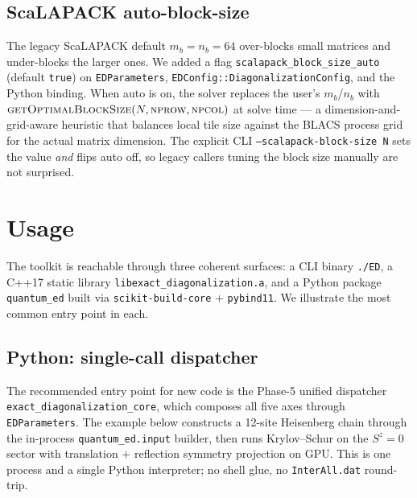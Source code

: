 \documentclass[submission, PhysCodeb]{SciPost}
\begin{document}
\subsection{ScaLAPACK auto-block-size}
\label{sec:perf-scalapack}
The legacy ScaLAPACK default $m_b = n_b = 64$ over-blocks small
matrices and under-blocks the larger ones. We added a flag
\texttt{scalapack\_block\_size\_auto} (default \texttt{true}) on
\texttt{EDParameters}, \texttt{EDConfig::DiagonalizationConfig}, and
the Python binding. When auto is on, the solver replaces the user's
$m_b$/$n_b$ with $\textsc{getOptimalBlockSize}(N,
\textsc{nprow}, \textsc{npcol})$ at solve time --- a
dimension-and-grid-aware heuristic that balances local tile size
against the BLACS process grid for the actual matrix dimension. The
explicit CLI \texttt{--scalapack-block-size N} sets the value
\emph{and} flips auto off, so legacy callers tuning the block size
manually are not surprised.

\section{Usage}
\label{sec:usage}

The toolkit is reachable through three coherent surfaces: a CLI
binary \texttt{./ED}, a C++17 static library
\texttt{libexact\_diagonalization.a}, and a Python package
\texttt{quantum\_ed} built via \texttt{scikit-build-core} +
\texttt{pybind11}. We illustrate the most common entry point in each.

\subsection{Python: single-call dispatcher}
\label{sec:usage-python}

The recommended entry point for new code is the Phase-5 unified
dispatcher \texttt{exact\_diagonalization\_core}, which composes
all five axes through \texttt{EDParameters}. The example below
constructs a 12-site Heisenberg chain through the in-process
\texttt{quantum\_ed.input} builder, then runs Krylov--Schur on the
$S^z=0$ sector with translation $+$ reflection symmetry projection on
GPU. This is one process and a single Python interpreter; no shell
glue, no \texttt{InterAll.dat} round-trip.
\end{document}
